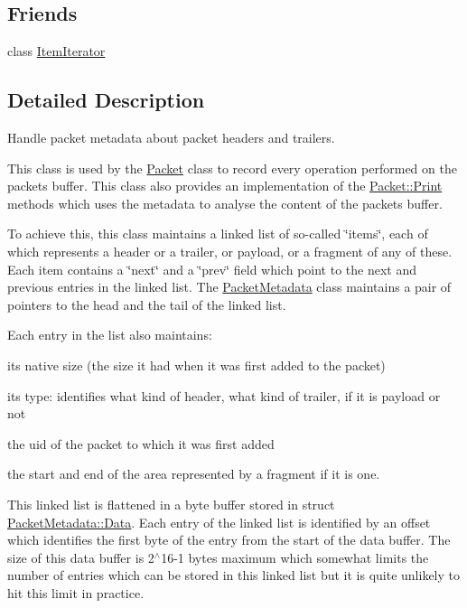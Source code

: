 \subsection*{Friends}
\begin{DoxyCompactItemize}
\item 
class \hyperlink{classns3_1_1PacketMetadata_a32606143b9dd3fe0db01264200e27783}{Item\+Iterator}
\end{DoxyCompactItemize}


\subsection{Detailed Description}
Handle packet metadata about packet headers and trailers. 

This class is used by the \hyperlink{classns3_1_1Packet}{Packet} class to record every operation performed on the packet\textquotesingle{}s buffer. This class also provides an implementation of the \hyperlink{classns3_1_1Packet_aa34058a5cdbf94673531f8c4001ab227}{Packet\+::\+Print} methods which uses the metadata to analyse the content of the packet\textquotesingle{}s buffer.

To achieve this, this class maintains a linked list of so-\/called \char`\"{}items\char`\"{}, each of which represents a header or a trailer, or payload, or a fragment of any of these. Each item contains a \char`\"{}next\char`\"{} and a \char`\"{}prev\char`\"{} field which point to the next and previous entries in the linked list. The \hyperlink{classns3_1_1PacketMetadata}{Packet\+Metadata} class maintains a pair of pointers to the head and the tail of the linked list.

Each entry in the list also maintains\+:
\begin{DoxyItemize}
\item its native size (the size it had when it was first added to the packet)
\item its type\+: identifies what kind of header, what kind of trailer, if it is payload or not
\item the uid of the packet to which it was first added
\item the start and end of the area represented by a fragment if it is one.
\end{DoxyItemize}

This linked list is flattened in a byte buffer stored in struct \hyperlink{structns3_1_1PacketMetadata_1_1Data}{Packet\+Metadata\+::\+Data}. Each entry of the linked list is identified by an offset which identifies the first byte of the entry from the start of the data buffer. The size of this data buffer is 2$^\wedge$16-\/1 bytes maximum which somewhat limits the number of entries which can be stored in this linked list but it is quite unlikely to hit this limit in practice.

